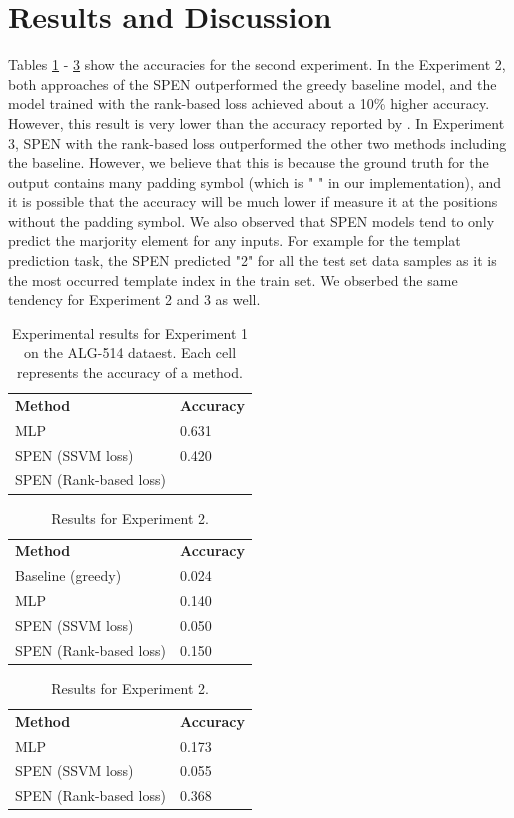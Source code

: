 \documentclass[11pt,letterpaper]{article}
\begin{document}
\section{Results and Discussion}
Tables \ref{exp1} - \ref{exp3} show the accuracies for the second experiment. In the Experiment 2, both approaches of the SPEN outperformed the greedy baseline model, and the model trained with the rank-based loss achieved about a 10\% higher accuracy. However, this result is very lower than the accuracy reported by \cite{Kushman2014LearningTA}. In Experiment 3, SPEN with the rank-based loss outperformed the other two methods including the baseline. However, we believe that this is because the ground truth for the output contains many padding symbol (which is " " in our implementation), and it is possible that the accuracy will be much lower if measure it at the positions without the padding symbol. We also observed that SPEN models tend to only predict the marjority element for any inputs. For example for the templat prediction task, the SPEN predicted "2" for all the test set data samples as it is the most occurred template index in the train set. We obserbed the same tendency for Experiment 2 and 3 as well.
%
\begin{table}[]
\centering
\caption{Experimental results for Experiment 1 on the ALG-514 dataest. Each cell represents the accuracy of a method.}
\label{exp1}
\begin{tabular}{ll}
\textbf{Method}        & \textbf{Accuracy} \\
MLP                    & 0.631             \\
SPEN (SSVM loss)       & 0.420             \\
SPEN (Rank-based loss) &                  
\end{tabular}
\end{table}
%
\begin{table}[]
\centering
\caption{Results for Experiment 2.}
\label{exp2}
\begin{tabular}{ll}
\textbf{Method}        & \textbf{Accuracy} \\
Baseline (greedy)      & 0.024             \\
MLP                    & 0.140              \\
SPEN (SSVM loss)       & 0.050              \\
SPEN (Rank-based loss) & 0.150             
\end{tabular}
\end{table}
%
\begin{table}[]
\centering
\caption{Results for Experiment 2.}
\label{exp3}
\begin{tabular}{ll}
\textbf{Method}        & \textbf{Accuracy} \\
MLP                    & 0.173             \\
SPEN (SSVM loss)       & 0.055             \\
SPEN (Rank-based loss) & 0.368            
\end{tabular}
\end{table}
\end{document}
